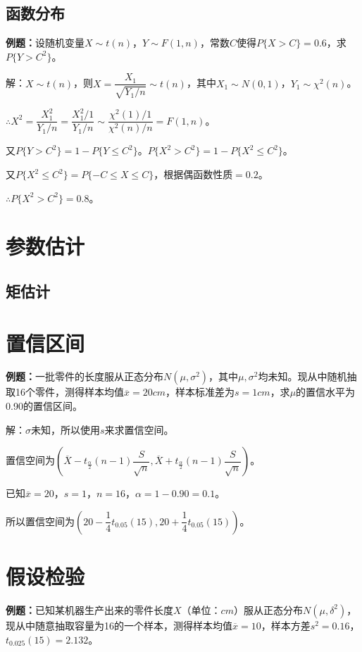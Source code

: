\documentclass[UTF8, 12pt]{ctexart}
\begin{document}
\subsection{函数分布}

\textbf{例题：}设随机变量$X\sim t(n)$，$Y\sim F(1,n)$，常数$C$使得$P\{X>C\}=0.6$，求$P\{Y>C^2\}$。

解：$X\sim t(n)$，则$X=\dfrac{X_1}{\sqrt{Y_1/n}}\sim t(n)$，其中$X_1\sim N(0,1)$，$Y_1\sim\chi^2(n)$。

$\therefore X^2=\dfrac{X_1^2}{Y_1/n}=\dfrac{X_1^2/1}{Y_1/n}\sim\dfrac{\chi^2(1)/1}{\chi^2(n)/n}=F(1,n)$。

又$P\{Y>C^2\}=1-P\{Y\leqslant C^2\}$。$P\{X^2>C^2\}=1-P\{X^2\leqslant C^2\}$。

又$P\{X^2\leqslant C^2\}=P\{-C\leqslant X\leqslant C\}$，根据偶函数性质$=0.2$。

$\therefore P\{X^2>C^2\}=0.8$。

\section{参数估计}

\subsection{矩估计}

\section{置信区间}

\textbf{例题：}一批零件的长度服从正态分布$N(\mu,\sigma^2)$，其中$\mu,\sigma^2$均未知。现从中随机抽取16个零件，测得样本均值$\overline{x}=20cm$，样本标准差为$s=1cm$，求$\mu$的置信水平为0.90的置信区间。

解：$\sigma$未知，所以使用$s$来求置信空间。

置信空间为$(\overline{X}-t_\frac{\alpha}{2}(n-1)\dfrac{S}{\sqrt{n}},\overline{X}+t_\frac{\alpha}{2}(n-1)\dfrac{S}{\sqrt{n}})$。

已知$\overline{x}=20$，$s=1$，$n=16$，$\alpha=1-0.90=0.1$。

所以置信空间为$\left(20-\dfrac{1}{4}t_{0.05}(15),20+\dfrac{1}{4}t_{0.05}(15)\right)$。

\section{假设检验}

\textbf{例题：}已知某机器生产出来的零件长度$X$（单位：$cm$）服从正态分布$N(\mu,\delta^2)$，现从中随意抽取容量为16的一个样本，测得样本均值$\overline{x}=10$，样本方差$s^2=0.16$，$t_{0.025}(15)=2.132$。
\end{document}
